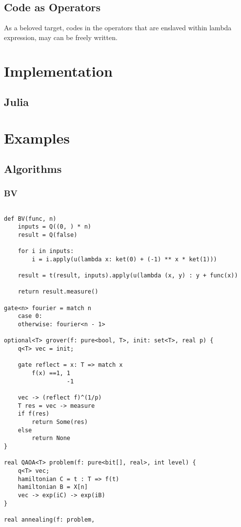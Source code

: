 \documentclass[a4paper,11pt]{article}
\begin{document}
\subsection{Code as Operators}
As a beloved target, codes in the operators that are enslaved within lambda expression, may can be freely written.

\section{Implementation}
\subsection{Julia}
\section{Examples}
\subsection{Algorithms}
\subsubsection{BV}

\begin{lstlisting}

def BV(func, n)
    inputs = Q((0, ) * n)
    result = Q(false)
    
    for i in inputs:
        i = i.apply(u(lambda x: ket(0) + (-1) ** x * ket(1)))
    
    result = t(result, inputs).apply(u(lambda (x, y) : y + func(x))
    
    return result.measure() 

gate<n> fourier = match n
    case 0:
    otherwise: fourier<n - 1>

optional<T> grover(f: pure<bool, T>, init: set<T>, real p) {
    q<T> vec = init;

    gate reflect = x: T => match x
        f(x) ==1, 1
                  -1

    vec -> (reflect f)^(1/p)
    T res = vec -> measure
    if f(res)
        return Some(res)
    else
        return None
}

real QAOA<T> problem(f: pure<bit[], real>, int level) {
    q<T> vec;
    hamiltonian C = t : T => f(t)
    hamiltonian B = X[n]
    vec -> exp(iC) -> exp(iB)
}

real annealing(f: problem,

\end{lstlisting}
\end{document}
